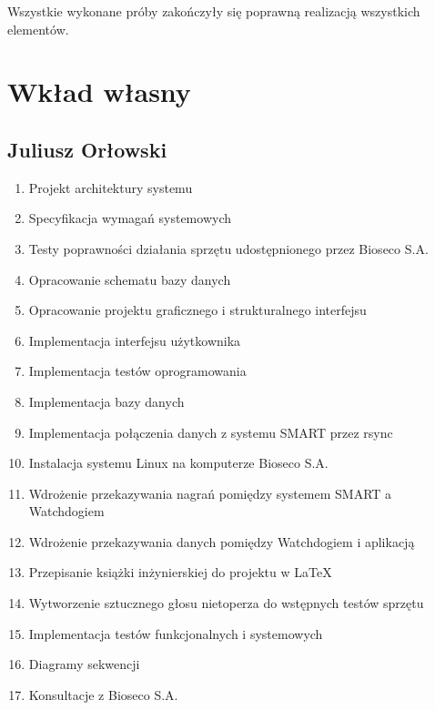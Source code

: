 \documentclass{sprz}
\begin{document}
Wszystkie wykonane próby zakończyły się poprawną realizacją wszystkich elementów.

\chapter{Wkład własny}

\section{Juliusz Orłowski}

\begin{enumerate}
  \item Projekt architektury systemu
  \item Specyfikacja wymagań systemowych
  \item Testy poprawności działania sprzętu udostępnionego przez Bioseco S.A.
  \item Opracowanie schematu bazy danych
  \item Opracowanie projektu graficznego i strukturalnego interfejsu
  \item Implementacja interfejsu użytkownika
  \item Implementacja testów oprogramowania
  \item Implementacja bazy danych
  \item Implementacja połączenia danych z systemu SMART przez rsync
  \item Instalacja systemu Linux na komputerze Bioseco S.A.
  \item Wdrożenie przekazywania nagrań pomiędzy systemem SMART a Watchdogiem
  \item Wdrożenie przekazywania danych pomiędzy Watchdogiem i aplikacją
  \item Przepisanie książki inżynierskiej do projektu w LaTeX
  \item Wytworzenie sztucznego głosu nietoperza do wstępnych testów sprzętu
  \item Implementacja testów funkcjonalnych i systemowych
  \item Diagramy sekwencji
  \item Konsultacje z Bioseco S.A.
\end{enumerate}
\end{document}
